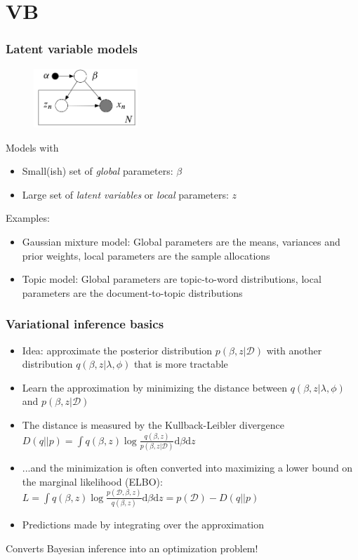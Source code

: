 \documentclass{beamer}
\newcommand{\dataset}{\mathcal{D}}
\newcommand{\diff}{\mathrm{d}}
\begin{document}
\section{VB}

\begin{frame}
  \frametitle{Latent variable models}

  \begin{figure}
  \begin{center}
  \includegraphics[width=0.35\textwidth]{LVM.png}
  \end{center}
  \end{figure}

  Models with
  \begin{itemize}
  \item Small(ish) set of \emph{global} parameters: $\beta$
  \item Large set of \emph{latent variables} or \emph{local} parameters: $z$
  \end{itemize}

  Examples:
  \begin{itemize}
  \item Gaussian mixture model: Global parameters are the means,
    variances and prior weights, local parameters are the sample
    allocations
  \item Topic model: Global parameters are topic-to-word distributions,
    local parameters are the document-to-topic distributions
  \end{itemize}
\end{frame}

\begin{frame}
  \frametitle{Variational inference basics}

  \begin{itemize}
  \item Idea: approximate the posterior distribution $p(\beta, z| \dataset)$
    with another distribution $q(\beta,z|\lambda,\phi)$ that is more
    tractable
  \item Learn the approximation by minimizing the distance between $q(\beta,z|\lambda,\phi)$ and $p(\beta, z |\dataset)$
  \item The distance is measured by the Kullback-Leibler divergence
    $D(q||p) = \int q(\beta,z) \log \frac{q(\beta,z)}{p(\beta,z| \dataset)}\diff \beta \diff z$
  \item ...and the minimization is often converted into maximizing a lower bound on the marginal
    likelihood (ELBO):
    $L = \int q(\beta,z) \log \frac{p(\dataset,\beta,z)}{q(\beta,z)} \diff \beta \diff z = p(\dataset) - D(q||p)$
  \item Predictions made by integrating over the approximation
  \end{itemize}

  Converts Bayesian inference into an optimization problem!
\end{frame}
\end{document}
